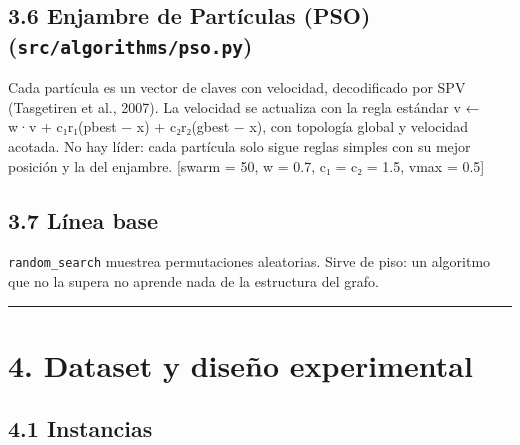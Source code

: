\documentclass[
  spanish,
  12pt,
]{article}
\begin{document}
\subsection{\texorpdfstring{3.6 Enjambre de Partículas (PSO)
(\texttt{src/algorithms/pso.py})}{3.6 Enjambre de Partículas (PSO) (src/algorithms/pso.py)}}\label{enjambre-de-partuxedculas-pso-srcalgorithmspso.py}

Cada partícula es un vector de claves con velocidad, decodificado por
SPV (Tasgetiren et al., 2007). La velocidad se actualiza con la regla
estándar v ← w·v + c₁r₁(pbest − x) + c₂r₂(gbest − x), con topología
global y velocidad acotada. No hay líder: cada partícula solo sigue
reglas simples con su mejor posición y la del enjambre. {[}swarm = 50, w
= 0.7, c₁ = c₂ = 1.5, vmax = 0.5{]}

\subsection{3.7 Línea base}\label{luxednea-base}

\texttt{random\_search} muestrea permutaciones aleatorias. Sirve de
piso: un algoritmo que no la supera no aprende nada de la estructura del
grafo.

\begin{center}\rule{0.5\linewidth}{0.5pt}\end{center}

\section{4. Dataset y diseño
experimental}\label{dataset-y-diseuxf1o-experimental}

\subsection{4.1 Instancias}\label{instancias}
\end{document}
